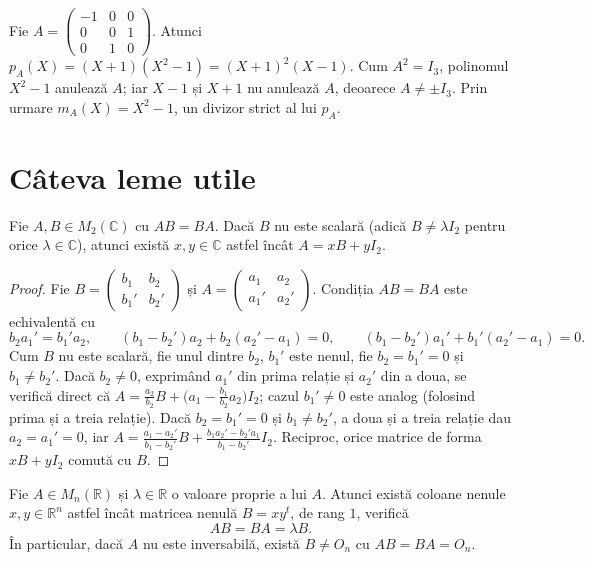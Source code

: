 \begin{exemplu}
Fie $A=\begin{pmatrix}-1&0&0\\0&0&1\\0&1&0\end{pmatrix}$. Atunci $p_A(X)=(X+1)(X^2-1)=(X+1)^2(X-1)$. Cum $A^2=I_3$, polinomul $X^2-1$ anulează $A$; iar $X-1$ și $X+1$ nu anulează $A$, deoarece $A\neq\pm I_3$. Prin urmare $m_A(X)=X^2-1$, un divizor strict al lui $p_A$.
\end{exemplu}

\section{Câteva leme utile}

\begin{lema}\label{lema:comut2x2}
Fie $A,B\in M_2(\mathbb{C})$ cu $AB=BA$. Dacă $B$ nu este scalară (adică $B\neq\lambda I_2$ pentru orice $\lambda\in\mathbb{C}$), atunci există $x,y\in\mathbb{C}$ astfel încât $A=xB+yI_2$.
\end{lema}

\begin{proof}
Fie $B=\begin{pmatrix}b_1&b_2\\b_1'&b_2'\end{pmatrix}$ și $A=\begin{pmatrix}a_1&a_2\\a_1'&a_2'\end{pmatrix}$. Condiția $AB=BA$ este echivalentă cu
\[
b_2a_1'=b_1'a_2,\qquad (b_1-b_2')a_2+b_2(a_2'-a_1)=0,\qquad (b_1-b_2')a_1'+b_1'(a_2'-a_1)=0 .
\]
Cum $B$ nu este scalară, fie unul dintre $b_2$, $b_1'$ este nenul, fie $b_2=b_1'=0$ și $b_1\neq b_2'$. Dacă $b_2\neq0$, exprimând $a_1'$ din prima relație și $a_2'$ din a doua, se verifică direct că $A=\frac{a_2}{b_2}B+\bigl(a_1-\frac{b_1}{b_2}a_2\bigr)I_2$; cazul $b_1'\neq0$ este analog (folosind prima și a treia relație). Dacă $b_2=b_1'=0$ și $b_1\neq b_2'$, a doua și a treia relație dau $a_2=a_1'=0$, iar $A=\frac{a_1-a_2'}{b_1-b_2'}B+\frac{b_1a_2'-b_2'a_1}{b_1-b_2'}I_2$. Reciproc, orice matrice de forma $xB+yI_2$ comută cu $B$.
\end{proof}

\begin{lema}\label{lema:ABBAlambdaB}
Fie $A\in M_n(\mathbb{R})$ și $\lambda\in\mathbb{R}$ o valoare proprie a lui $A$. Atunci există coloane nenule $x,y\in\mathbb{R}^n$ astfel încât matricea nenulă $B=xy^t$, de rang $1$, verifică
\[
AB=BA=\lambda B .
\]
În particular, dacă $A$ nu este inversabilă, există $B\neq O_n$ cu $AB=BA=O_n$.
\end{lema}

